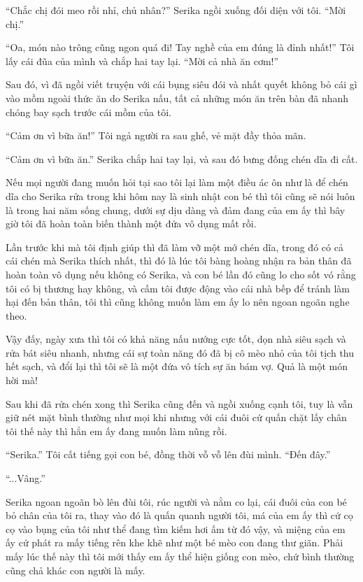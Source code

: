 {``Chắc chị đói meo rồi nhỉ, chủ nhân?'' Serika ngồi xuống đối diện với
tôi. ``Mời chị.''

``Oa, món nào trông cũng ngon quá đi! Tay nghề của em đúng là đỉnh
nhất!'' Tôi lấy cái đũa của mình và chắp hai tay lại. ``Mời cả nhà ăn
cơm!''

Sau đó, vì đã ngồi viết truyện với cái bụng siêu đói và nhất quyết không
bỏ cái gì vào mồm ngoài thức ăn do Serika nấu, tất cả những món ăn trên
bàn đã nhanh chóng bay sạch trước cái mồm của tôi.

``Cảm ơn vì bữa ăn!'' Tôi ngả người ra sau ghế, vẻ mặt đầy thỏa mãn.

``Cảm ơn vì bữa ăn.'' Serika chắp hai tay lại, và sau đó bưng đống chén
dĩa đi cất.

Nếu mọi người đang muốn hỏi tại sao tôi lại làm một điều ác ôn như là để
chén dĩa cho Serika rửa trong khi hôm nay là sinh nhật con bé thì tôi
cũng sẽ nói luôn là trong hai năm sống chung, dưới sự dịu dàng và đảm
đang của em ấy thì bây giờ tôi đã hoàn toàn biến thành một đứa vô dụng
mất rồi.

Lần trước khi mà tôi định giúp thì đã làm vỡ một mớ chén dĩa, trong đó
có cả cái chén mà Serika thích nhất, thì đó là lúc tôi bàng hoàng nhận
ra bản thân đã hoàn toàn vô dụng nếu không có Serika, và con bé lần đó
cũng lo cho sốt vó rằng tôi có bị thương hay không, và cấm tôi được động
vào cái nhà bếp để tránh làm hại đến bản thân, tôi thì cũng không muốn
làm em ấy lo nên ngoan ngoãn nghe theo.

Vậy đấy, ngày xưa thì tôi có khả năng nấu nướng cực tốt, dọn nhà siêu
sạch và rửa bát siêu nhanh, nhưng cái sự toàn năng đó đã bị cô mèo nhỏ
của tôi tịch thu hết sạch, và đổi lại thì tôi sẽ là một đứa vô tích sự
ăn bám vợ. Quả là một món hời mà!

Sau khi đã rửa chén xong thì Serika cũng đến và ngồi xuống cạnh tôi, tuy
là vẫn giữ nét mặt bình thường như mọi khi nhưng với cái đuôi cứ quấn
chặt lấy chân tôi thế này thì hẳn em ấy đang muốn làm nũng rồi.

``Serika.'' Tôi cất tiếng gọi con bé, đồng thời vỗ vỗ lên đùi mình.
``Đến đây.''

``...Vâng.''

Serika ngoan ngoãn bò lên đùi tôi, rúc người và nằm co lại, cái đuôi của
con bé bỏ chân của tôi ra, thay vào đó là quấn quanh người tôi, má của
em ấy thì cứ cọ cọ vào bụng của tôi như thể đang tìm kiếm hơi ấm từ đó
vậy, và miệng của em ấy cứ phát ra mấy tiếng rên khe khẽ như một bé mèo
con đang thư giãn. Phải mấy lúc thế này thì tôi mới thấy em ấy thể hiện
giống con mèo, chứ bình thường cũng chả khác con người là mấy.

}
